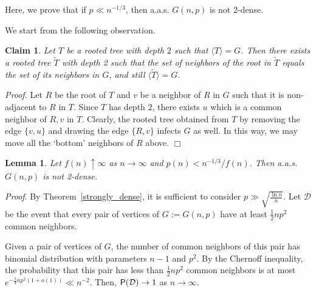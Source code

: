 \documentclass[]{article}
\newtheorem{lemma}[theorem]{Lemma}
\newtheorem{claim}[theorem]{Claim}
\begin{document}

Here, we prove that if $p\ll n^{-1/3}$, then a.a.s. $G(n,p)$ is not 2-dense.

We start from the following observation.

\begin{claim}
 Let $T$ be a rooted tree with depth $2$ such that $\langle T\rangle=G$. Then there exists a rooted tree $\tilde T$ with depth 2 such that the set of neighbors of the root in $\tilde T$ equals the set of its neighbors in $G$, and still $\langle \tilde T\rangle =G$.
\label{all_neighbors}
\end{claim} 

{\it Proof.} Let $R$ be the root of $T$ and $v$ be a neighbor of $R$ in $G$ such that it is non-adjacent to $R$ in $T$. Since $T$ has depth $2$, there exists $u$ which is a common neighbor of $R,v$ in $T$. Clearly, the rooted tree obtained from $T$ by removing the edge $\{v,u\}$ and drawing the edge $\{R,v\}$ infects $G$ as well. In this way, we may move all the `bottom' neighbors of $R$ above. $\Box$

\begin{lemma}
Let $f(n)\uparrow\infty$ as $n\to\infty$ and $p(n)<n^{-1/3}/f(n)$. Then a.a.s. $G(n,p)$ is not 2-dense.
\end{lemma}

{\it Proof}. %
By Theorem~\ref{strongly_dense}, it is sufficient to consider $p\gg\sqrt{\frac{\ln n}{n}}$.
Let $\mathcal{D}$ be the event that every pair of vertices of $G:=G(n,p)$ have at least $\frac{1}{2}np^2$ common neighbors. 

Given a pair of vertices of $G$, the number of common neighbors of this pair has binomial distribution with parameters $n-1$ and $p^2$. By the Chernoff inequality, the probability that this pair has less than $\frac{1}{2}np^2$ common neighbors is at most $e^{-\frac{1}{4}np^2(1+o(1))}\ll n^{-2}$. Then, ${\sf P}(\mathcal{D})\to 1$ as $n\to\infty$.\\
\end{document}
